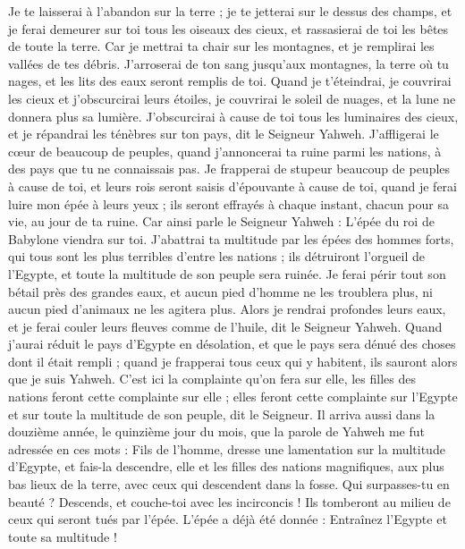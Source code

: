 \begin{multicols}{2}
Je te laisserai à l'abandon sur la terre ; je te jetterai sur le dessus des champs, et je ferai demeurer sur toi tous les oiseaux des cieux, et rassasierai de toi les bêtes de toute la terre.
Car je mettrai ta chair sur les montagnes, et je remplirai les vallées de tes débris.
J'arroserai de ton sang jusqu'aux montagnes, la terre où tu nages, et les lits des eaux seront remplis de toi.
Quand je t'éteindrai, je couvrirai les cieux et j'obscurcirai leurs étoiles, je couvrirai le soleil de nuages, et la lune ne donnera plus sa lumière.
J'obscurcirai à cause de toi tous les luminaires des cieux, et je répandrai les ténèbres sur ton pays, dit le Seigneur Yahweh.
J'affligerai le cœur de beaucoup de peuples, quand j'annoncerai ta ruine parmi les nations, à des pays que tu ne connaissais pas.
Je frapperai de stupeur beaucoup de peuples à cause de toi, et leurs rois seront saisis d'épouvante à cause de toi, quand je ferai luire mon épée à leurs yeux ; ils seront effrayés à chaque instant, chacun pour sa vie, au jour de ta ruine.
Car ainsi parle le Seigneur Yahweh : L'épée du roi de Babylone viendra sur toi.
J'abattrai ta multitude par les épées des hommes forts, qui tous sont les plus terribles d'entre les nations ; ils détruiront l'orgueil de l'Egypte, et toute la multitude de son peuple sera ruinée.
Je ferai périr tout son bétail près des grandes eaux, et aucun pied d'homme ne les troublera plus, ni aucun pied d'animaux ne les agitera plus.
Alors je rendrai profondes leurs eaux, et je ferai couler leurs fleuves comme de l'huile, dit le Seigneur Yahweh.
Quand j'aurai réduit le pays d'Egypte en désolation, et que le pays sera dénué des choses dont il était rempli ; quand je frapperai tous ceux qui y habitent, ils sauront alors que je suis Yahweh.
C'est ici la complainte qu'on fera sur elle, les filles des nations feront cette complainte sur elle ; elles feront cette complainte sur l'Egypte et sur toute la multitude de son peuple, dit le Seigneur.
Il arriva aussi dans la douzième année, le quinzième jour du mois, que la parole de Yahweh me fut adressée en ces mots :
Fils de l'homme, dresse une lamentation sur la multitude d'Egypte, et fais-la descendre, elle et les filles des nations magnifiques, aux plus bas lieux de la terre, avec ceux qui descendent dans la fosse.
Qui surpasses-tu en beauté ? Descends, et couche-toi avec les incirconcis !
Ils tomberont au milieu de ceux qui seront tués par l'épée. L'épée a déjà été donnée : Entraînez l'Egypte et toute sa multitude !

\end{multicols}
